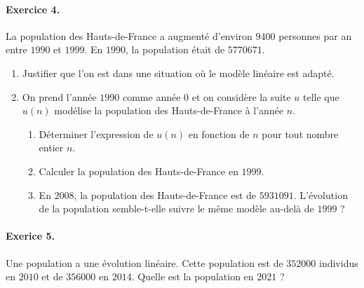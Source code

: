 \documentclass[11pt]{article}
\begin{document}
\paragraph{Exercice 4.}
La population des Hauts-de-France a augmenté d'environ $9400$ personnes par an entre $1990$ et $1999$. En $1990$, la population était de $5770671$.
\begin{enumerate}
	\item Justifier que l'on est dans une situation où le modèle linéaire est
      adapté.
	\item On prend l'année $1990$ comme année $0$ et on considère la suite $u$
      telle que $u(n)$ modélise la population des Hauts-de-France à l'année $n$.
	\begin{enumerate}
		\item Déterminer l'expression de $u(n)$ en fonction de $n$ pour tout
          nombre entier $n$.
		\item Calculer la population des Hauts-de-France en $1999$.
		\item En $2008$, la population des Hauts-de-France est de
          $5931091$. L'évolution de la population semble-t-elle suivre le
          même modèle au-delà de $1999$ ?
	\end{enumerate}
\end{enumerate}

\paragraph{Exerice 5.}
Une population a une évolution linéaire. Cette population est de $352000$
individus en $2010$ et de $356000$ en $2014$. Quelle est la population en
$2021$ ?
\end{document}
